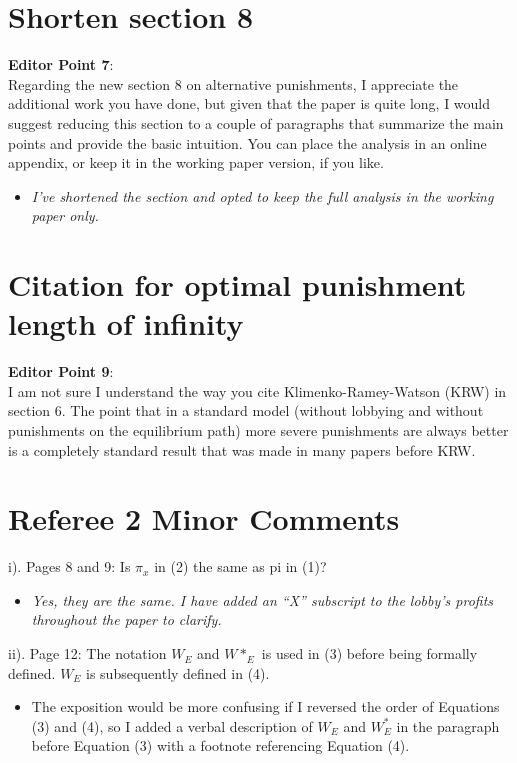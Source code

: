 \documentclass[12pt]{article}
\begin{document}
\section{Shorten section 8}
\label{sec:sec8}
\textbf{Editor Point 7}:\\
Regarding the new section 8 on alternative punishments, I appreciate the additional work you have done, but given that the paper is quite long, I would suggest reducing this section to a couple of paragraphs that summarize the main points and provide the basic intuition. You can place the analysis in an online appendix, or keep it in the working paper version, if you like.
\begin{itemize}
\renewcommand\labelitemi{-}
	\item \textit{I've shortened the section and opted to keep the full analysis in the working paper only.}
\end{itemize}

\section{Citation for optimal punishment length of infinity}
\textbf{Editor Point 9}:\\
I am not sure I understand the way you cite Klimenko-Ramey-Watson (KRW) in section 6. The point that in a standard model (without lobbying and without punishments on the equilibrium path) more severe punishments are always better is a completely standard result that was made in many papers before KRW.


\section{Referee 2 Minor Comments}
i).  Pages 8 and 9: Is $\pi_x$ in (2) the same as pi in (1)?
\begin{itemize}
\renewcommand\labelitemi{-}
	\item \textit{Yes, they are the same. I have added an ``X'' subscript to the lobby's profits throughout the paper to clarify.}
\end{itemize}

ii). Page 12: The notation $W_E$ and $W*_E$ is used in (3) before being formally defined. $W_E$ is subsequently defined in (4).
\begin{itemize}
\renewcommand\labelitemi{-}
	\item The exposition would be more confusing if I reversed the order of Equations (3) and (4), so I added a verbal description of $W_E$ and $W_E^*$ in the paragraph before Equation (3) with a footnote referencing Equation (4).
\end{itemize}
\end{document}
